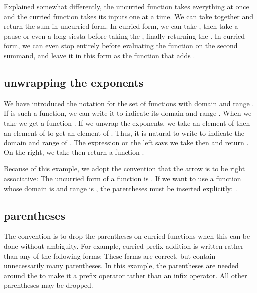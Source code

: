 Explained somewhat differently, the uncurried function takes everything at once and the curried function takes its inputs one at a time.  We can take  together and return the sum  in uncurried form.  In curried form, we can take , then take a pause or even a long siesta before taking the , finally returning the .  In curried form, we can even stop entirely before evaluating the function  on the second summand, and leave it in this form as the function that adds .

\subsection{unwrapping the exponents}

We have introduced the notation  for the set of functions with domain  and range .    If  is such a function, we can write it
 to indicate its domain  and range .  When we take
 we get a function .  If we unwrap the exponents, we
take an element of  then an element of  to get an element of .
Thus, it is natural to write
to indicate the domain and range of .  The expression on the left
says we take  then  and return .  On the
right, we take  then return a function .

Because of this example, we adopt the convention that the arrow \mc{$\to$}
is to be right associative:
The uncurried form of a function  is .
If we want to use a function  whose domain is  and range is ,
the parentheses must be inserted explicitly: .

\subsection{parentheses}

The convention is to drop the parentheses on curried functions when this can be done without ambiguity.  For example, curried prefix addition is written
rather than any of the following forms:
These forms are correct, but contain unnecessarily many parentheses.
In this example, the parentheses are needed around the \mc{$(+)$} to make it
a prefix operator rather than an infix operator. All other parentheses may
be dropped.

